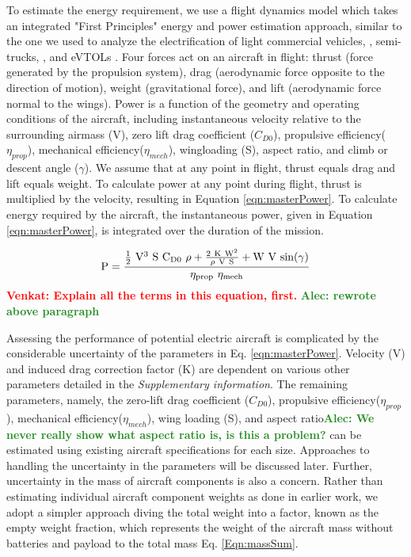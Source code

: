 \documentclass{achemso}
\newcommand{\vv}[1]{{\textbf{\textcolor{red}{Venkat: #1}}}}
\newcommand{\ab}[1]{{\textbf{\textcolor{ForestGreen}{Alec: #1}}}}
\begin{document}
To estimate the energy requirement, we use a flight dynamics model which takes an integrated "First Principles" energy and power estimation approach, similar to the one we used to analyze the electrification of light commercial vehicles, \cite{sripad2017evaluation}, semi-trucks, \cite{guttenberg2017evaluating,sripad2017performance}, and eVTOLs \cite{fredericks2018performance}. Four forces act on an aircraft in flight: thrust (force generated by the propulsion system), drag (aerodynamic force opposite to the direction of motion), weight (gravitational force), and lift (aerodynamic force normal to the wings). Power is a function of the geometry and operating conditions of the aircraft, including instantaneous velocity relative to the surrounding airmass (V), zero lift drag coefficient ($C_{D0}$), propulsive efficiency($\eta_{prop}$), mechanical efficiency($\eta_{mech}$), wingloading (S), aspect ratio, and climb or descent angle ($\gamma$).  We assume that at any point in flight, thrust equals drag and lift equals weight. To calculate power at any point during flight,  thrust is multiplied by the velocity, resulting in Equation \ref{eqn:masterPower}\cite{Raymer}. To calculate energy required by the aircraft, the instantaneous power, given in Equation \ref{eqn:masterPower}, is integrated over the duration of the mission. 

\begin{equation}\label{eqn:masterPower}
    \centering
    \mathrm{P = \frac{\frac{1}{2}\ V^3\ S\ C_{D0}\ \rho + \frac{2\ K\ W^2}{\rho\ V\ S} + W\ V\ sin(\gamma)}{\eta_{prop}\ \eta_{mech} }}
\end{equation}
\vv{Explain all the terms in this equation, first.}
\ab{rewrote above paragraph}

Assessing the performance of potential electric aircraft is complicated by the considerable uncertainty of the parameters in Eq. \eqref{eqn:masterPower}. Velocity (V) and induced drag correction factor (K) are dependent on various other parameters detailed in the \textit{Supplementary information}. The remaining parameters, namely, the zero-lift drag coefficient ($C_{D0}$), propulsive efficiency($\eta_{prop}$), mechanical efficiency($\eta_{mech}$), wing loading (S), and aspect ratio\ab{We never really show what aspect ratio is, is this a problem?} can be estimated using existing aircraft specifications for each size. Approaches to handling the uncertainty in the parameters will be discussed later. Further, uncertainty in the mass of aircraft components is also a concern. Rather than estimating individual aircraft component weights as done in earlier work,\cite{GNADT20191} we adopt a simpler approach diving the total weight into a factor, known as the empty weight fraction, which represents the weight of the aircraft mass without batteries and payload to the total mass Eq. \eqref{Eqn:massSum}.
\end{document}
